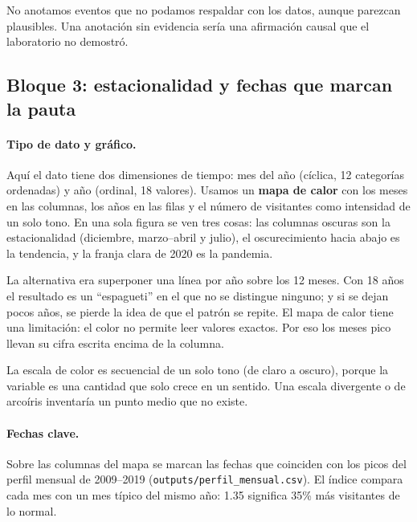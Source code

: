 No anotamos eventos que no podamos respaldar con los datos, aunque parezcan
plausibles. Una anotación sin evidencia sería una afirmación causal que el
laboratorio no demostró.

\subsection{Bloque 3: estacionalidad y fechas que marcan la pauta}

\paragraph{Tipo de dato y gráfico.} Aquí el dato tiene dos dimensiones de tiempo:
mes del año (cíclica, 12 categorías ordenadas) y año (ordinal, 18 valores).
Usamos un \textbf{mapa de calor} con los meses en las columnas, los años en las
filas y el número de visitantes como intensidad de un solo tono. En una sola
figura se ven tres cosas: las columnas oscuras son la estacionalidad (diciembre,
marzo--abril y julio), el oscurecimiento hacia abajo es la tendencia, y la franja
clara de 2020 es la pandemia.

La alternativa era superponer una línea por año sobre los 12 meses. Con 18 años
el resultado es un ``espagueti'' en el que no se distingue ninguno; y si se
dejan pocos años, se pierde la idea de que el patrón se repite. El mapa de calor
tiene una limitación: el color no permite leer valores exactos. Por eso los meses
pico llevan su cifra escrita encima de la columna.

La escala de color es secuencial de un solo tono (de claro a oscuro), porque la
variable es una cantidad que solo crece en un sentido. Una escala divergente o de
arcoíris inventaría un punto medio que no existe.

\paragraph{Fechas clave.} Sobre las columnas del mapa se marcan las fechas que
coinciden con los picos del perfil mensual de 2009--2019
(\texttt{outputs/perfil\_mensual.csv}). El índice compara cada mes con un mes
típico del mismo año: 1.35 significa 35\% más visitantes de lo normal.

